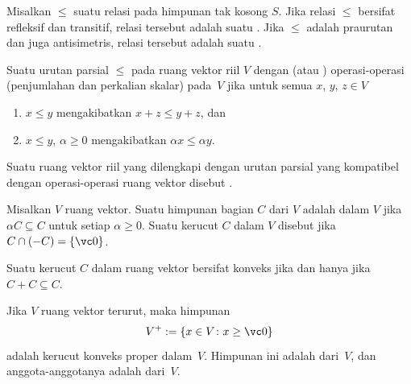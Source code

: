 \begin{defn} Misalkan $\le$ suatu relasi pada himpunan tak kosong $S$. Jika relasi
 $\le$ bersifat refleksif dan transitif, relasi tersebut adalah suatu
. Jika $\le$ adalah praurutan dan juga antisimetris, relasi tersebut adalah suatu
.

Suatu urutan parsial $\le$ pada ruang vektor riil $V$
 dengan (atau
) operasi-operasi (penjumlahan dan perkalian skalar) pada~$V$ jika untuk semua $x$,
$y$, $z \in V$
 \begin{enumerate}
  \item[(a)] $x \le y$ mengakibatkan $x+z \le y+z$, dan
  \item[(b)] $x \le y$, $\alpha \ge 0$ mengakibatkan $\alpha x \le \alpha y$.
 \end{enumerate}
Suatu ruang vektor riil yang dilengkapi dengan urutan parsial yang kompatibel dengan operasi-operasi
ruang vektor disebut
.
\end{defn}

\begin{defn} Misalkan $V$ ruang vektor. Suatu himpunan bagian $C$ dari $V$ adalah
 dalam $V$ jika $\alpha C \subseteq C$ untuk setiap $\alpha \ge 0$. Suatu kerucut $C$ dalam $V$
disebut
 jika $C \cap (-C) = \{\vc 0\}$.
\end{defn}

\begin{prop}\label{0018006} Suatu kerucut $C$ dalam ruang vektor bersifat konveks jika dan hanya jika $C + C
\subseteq C$.
\end{prop}

\begin{exam}\label{0018007} Jika $V$ ruang vektor terurut, maka himpunan
   \[ V^+ := \{x \in V \colon x \ge \vc 0\} \]
adalah kerucut konveks proper dalam~$V$. Himpunan ini adalah
 dari~$V$, dan anggota-anggotanya adalah
 dari~$V$.
\end{exam}

